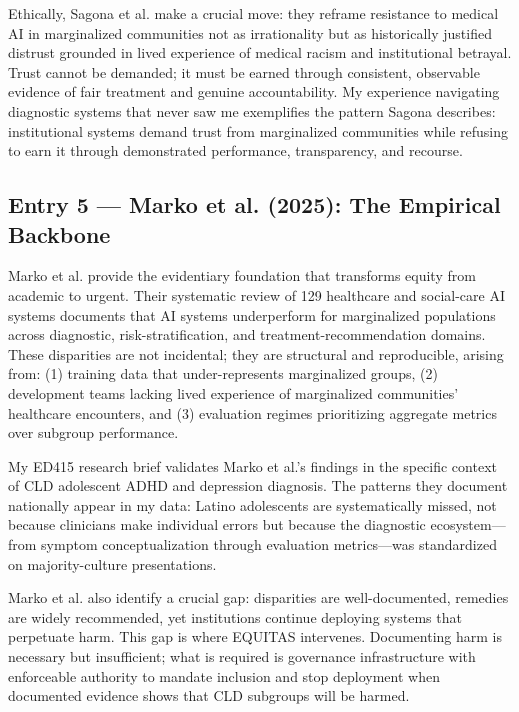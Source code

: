 \documentclass[12pt,a4paper]{article}
\begin{document}
Ethically, Sagona et al. make a crucial move: they reframe resistance to medical AI in marginalized communities not as irrationality but as historically justified distrust grounded in lived experience of medical racism and institutional betrayal.\cite{sagona2025} Trust cannot be demanded; it must be earned through consistent, observable evidence of fair treatment and genuine accountability.\cite{sagona2025} My experience navigating diagnostic systems that never saw me exemplifies the pattern Sagona describes: institutional systems demand trust from marginalized communities while refusing to earn it through demonstrated performance, transparency, and recourse.\cite{garcia_ed415}

\subsection{Entry 5 — Marko et al. (2025): The Empirical Backbone}

Marko et al. provide the evidentiary foundation that transforms equity from academic to urgent. Their systematic review of 129 healthcare and social-care AI systems documents that AI systems underperform for marginalized populations across diagnostic, risk-stratification, and treatment-recommendation domains.\cite{marko2025} These disparities are not incidental; they are structural and reproducible, arising from: (1) training data that under-represents marginalized groups, (2) development teams lacking lived experience of marginalized communities' healthcare encounters, and (3) evaluation regimes prioritizing aggregate metrics over subgroup performance.\cite{marko2025}

My ED415 research brief validates Marko et al.'s findings in the specific context of CLD adolescent ADHD and depression diagnosis.\cite{garcia_ed415} The patterns they document nationally appear in my data: Latino adolescents are systematically missed, not because clinicians make individual errors but because the diagnostic ecosystem—from symptom conceptualization through evaluation metrics—was standardized on majority-culture presentations.\cite{marko2025}

Marko et al. also identify a crucial gap: disparities are well-documented, remedies are widely recommended, yet institutions continue deploying systems that perpetuate harm.\cite{marko2025} This gap is where EQUITAS intervenes. Documenting harm is necessary but insufficient; what is required is governance infrastructure with enforceable authority to mandate inclusion and stop deployment when documented evidence shows that CLD subgroups will be harmed.\cite{marko2025}
\end{document}
